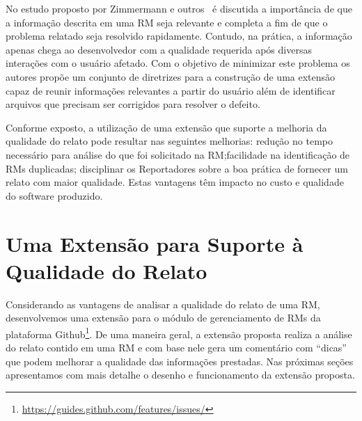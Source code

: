 No estudo proposto por Zimmermann e outros~\cite{5070993} é discutida a
importância de que a informação descrita em uma RM seja relevante e completa a
fim de que o problema relatado seja resolvido rapidamente.  Contudo, na prática,
a informação apenas chega ao desenvolvedor com a qualidade requerida após
diversas interações com o usuário afetado. Com o objetivo de minimizar este
problema os autores propõe um conjunto de diretrizes para a construção de uma
extensão capaz de reunir informações relevantes a partir do usuário além de
identificar arquivos que precisam ser corrigidos para resolver o defeito.

Conforme exposto, a utilização de uma extensão que suporte a melhoria da
qualidade do relato pode resultar nas seguintes melhorias: redução no tempo
necessário para análise do que foi solicitado na RM;facilidade na identificação
de RMs duplicadas; disciplinar os Reportadores sobre a boa prática de fornecer
um relato com maior qualidade. Estas vantagens têm impacto no custo e qualidade
do software produzido.

\section{Uma Extensão para Suporte à Qualidade do Relato}
\label{sec:uma_extensao_suporte_qualidade_relato}

Considerando as vantagens de analisar a qualidade do relato de uma RM,
desenvolvemos uma extensão para o módulo de gerenciamento de RMs da plataforma
Github\footnote{\url{https://guides.github.com/features/issues/}}. De uma
maneira geral, a extensão proposta realiza a análise do relato contido em uma RM
e com base nele gera um comentário com ``dicas'' que podem melhorar a qualidade
das informações prestadas. Nas próximas seções apresentamos com mais detalhe o
desenho e funcionamento da extensão proposta.


